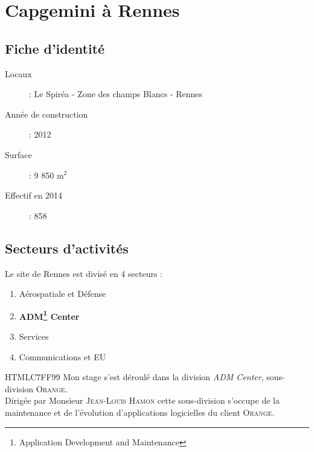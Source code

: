 \chapter{Capgemini à Rennes}
\section{Fiche d'identité}
\begin{description}
  \item[Locaux] : Le Spiréa - Zone des champs Blancs - Rennes
  \item[Année de construction] : 2012
  \item[Surface] : 9 850 m$^2$
  \item[Effectif en 2014] : 858
\end{description}
\begin{figure}[h]
\end{figure}
\newpage
\section{Secteurs d'activités}
Le site de Rennes est divisé en 4 secteurs :
\begin{enumerate}
\item Aérospatiale et Défense
\item \textbf{ADM\footnote{Application Development and Maintenance} Center}
\item Services
\item Communications et EU\\
\end{enumerate}

\begin{colbox}{{HTML}{C7FF99}}{}
  Mon stage s'est déroulé dans la division \textit{ADM Center}, sous-division \textsc{Orange}.\\
  Dirigée par Monsieur \textsc{Jean-Louis Hamon}
  cette sous-division s'occupe de la maintenance et de l'évolution d'applications logicielles du client \textsc{Orange}.
\end{colbox}

